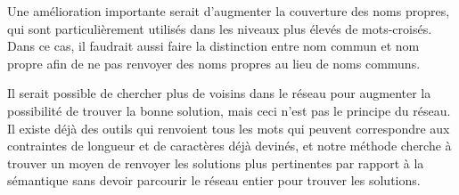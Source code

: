 Une amélioration importante serait d'augmenter la couverture des noms propres, qui sont particulièrement utilisés dans les niveaux plus élevés de mots-croisés. Dans ce cas, il faudrait aussi faire la distinction entre nom commun et nom propre afin de ne pas renvoyer des noms propres au lieu de noms communs.

Il serait possible de chercher plus de voisins dans le réseau pour augmenter la possibilité de trouver la bonne solution, mais ceci n'est pas le principe du réseau. Il existe déjà des outils qui renvoient tous les mots qui peuvent correspondre aux contraintes de longueur et de caractères déjà devinés, et notre méthode cherche à trouver un moyen de renvoyer les solutions plus pertinentes par rapport à la sémantique sans devoir parcourir le réseau entier pour trouver les solutions.








